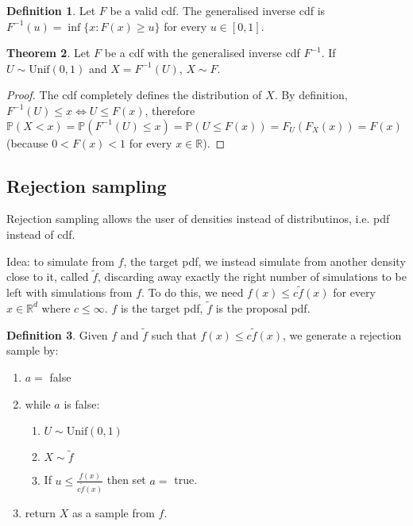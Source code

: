 \documentclass[12pt,a4paper]{article}
\theoremstyle{definition}
\newtheorem{definition}{Definition}[subsection]
\newtheorem{theorem}[definition]{Theorem}
\begin{document}
\begin{definition}
	Let $F$ be a valid cdf. The generalised inverse cdf is $F^{-1}(u) = \inf \{x: F(x) \ge u \}$ for every $u \in [0, 1]$.
\end{definition}

\begin{theorem}
	Let $F$ be a cdf with the generalised inverse cdf $F^{-1}$. If $U \sim \text{Unif}(0, 1)$ and $X = F^{-1}(U)$, $X \sim F$.
\end{theorem}

\begin{proof}
	The cdf completely defines the distribution of $X$. By definition, $F^{-1}(U) \le x \Leftrightarrow U \le F(x)$, therefore $\mathbb{P}(X < x) = \mathbb{P}(F^{-1}(U) \le x) = \mathbb{P}(U \le F(x)) = F_U(F_X(x)) = F(x)$ (because $0 < F(x) < 1$ for every $x \in \mathbb{R}$).
\end{proof}

\subsection{Rejection sampling}

Rejection sampling allows the user of densities instead of distributinos, i.e. pdf instead of cdf.

Idea: to simulate from $f$, the target pdf, we instead simulate from another density close to it, called $\tilde{f}$, discarding away exactly the right number of simulations to be left with simulations from $f$. To do this, we need $f(x) \le c \tilde{f}(x)$ for every $x \in \mathbb{R}^d$ where $c \le \infty$. $f$ is the target pdf, $\tilde{f}$ is the proposal pdf.

\begin{definition}
	Given $f$ and $\tilde{f}$ such that $f(x) \le c \tilde{f}(x)$, we generate a rejection sample by:

	\begin{enumerate}
		\item $a = $ false
		\item while $a$ is false:
		\begin{enumerate}
			\item $U \sim \text{Unif}(0, 1)$
			\item $X \sim \tilde{f}$
			\item If $u \le \frac{f(x)}{c\tilde{f}(x)}$ then set $a = $ true.
		\end{enumerate}
		\item return $X$ as a sample from $f$.
	\end{enumerate}
\end{definition}
\end{document}
